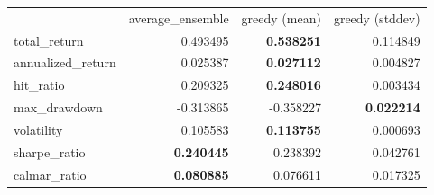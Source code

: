 \begin{tabular}{lrrr}
 & average_ensemble & greedy (mean) & greedy (stddev) \\
total_return & 0.493495 & \bfseries 0.538251 & 0.114849 \\
annualized_return & 0.025387 & \bfseries 0.027112 & 0.004827 \\
hit_ratio & 0.209325 & \bfseries 0.248016 & 0.003434 \\
max_drawdown & -0.313865 & -0.358227 & \bfseries 0.022214 \\
volatility & 0.105583 & \bfseries 0.113755 & 0.000693 \\
sharpe_ratio & \bfseries 0.240445 & 0.238392 & 0.042761 \\
calmar_ratio & \bfseries 0.080885 & 0.076611 & 0.017325 \\
\end{tabular}
